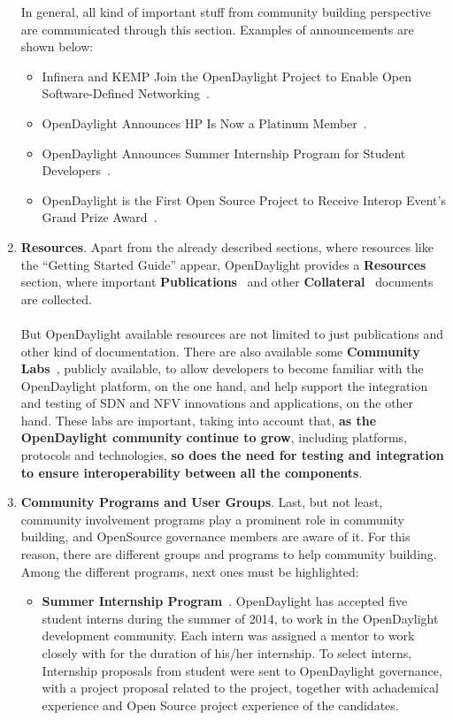 \documentclass[a4paper, 12pt]{book}
\begin{document}
\begin{enumerate}
\begin{itemize}
\end{itemize}
In general, all kind of important stuff from community building perspective are communicated through this section. Examples of announcements are shown below:
\begin{itemize}\itemsep0pt
\item{Infinera and KEMP Join the OpenDaylight Project to Enable Open Software-Defined Networking}~\cite{OpenDaylightAnnouncement01}.
\item{OpenDaylight Announces HP Is Now a Platinum Member}~\cite{OpenDaylightAnnouncement02}.
\item{OpenDaylight Announces Summer Internship Program for Student Developers}~\cite{OpenDaylightAnnouncement03}.
\item{OpenDaylight is the First Open Source Project to Receive Interop Event’s Grand Prize Award}~\cite{OpenDaylightAnnouncement04}.
\end{itemize}
\item{\textbf{Resources}}. Apart from the already described sections, where resources like the ``Getting Started Guide'' appear, OpenDaylight provides a \textbf{Resources~\cite{Resources}} section, where important \textbf{Publications}~\cite{OpenDaylightPublications} and other \textbf{Collateral}~\cite{OpenDaylightCollateral} documents are collected.\\
\\
But OpenDaylight available resources are not limited to just publications and other kind of documentation. There are also available some \textbf{Community Labs}~\cite{OpenDaylightCommunityLabs}, publicly available, to allow developers to become familiar with the OpenDaylight platform, on the one hand, and help support the integration and testing of SDN and NFV innovations and applications, on the other hand. These labs are important, taking into account that, \textbf{as the OpenDaylight community continue to grow}, including platforms, protocols and technologies, \textbf{so does the need for testing and integration to ensure interoperability between all the components}.
\item{\textbf{Community Programs and User Groups}}. Last, but not least, community involvement programs play a prominent role in community building, and OpenSource governance members are aware of it. For this reason, there are different groups and programs to help community building. Among the different programs, next ones must be highlighted:
\begin{itemize}\itemsep0pt
\item{\textbf{Summer Internship Program}~\cite{OpenDaylightInternshipProgram}}. OpenDaylight has accepted five student interns during the summer of 2014, to work in the OpenDaylight development community. Each intern was assigned a mentor to work closely with for the duration of his/her internship. To select interns, Internship proposals from student were sent to OpenDaylight governance, with a project proposal related to the project, together with achademical experience and Open Source project experience of the candidates.

\end{itemize}
\end{enumerate}
\end{document}
